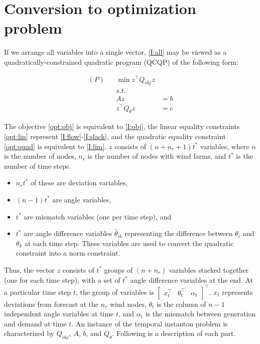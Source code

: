 \documentclass[conference]{IEEEtran}
\begin{document}
\section{Conversion to optimization problem}

If we arrange all variables into a single vector, \eqref{I:all} may be viewed as a quadratically-constrained quadratic program (QCQP) of the following form:

\begin{subequations}\label{opt}
\begin{align}
\label{opt:obj} (P)& & \min z^\top Q_{obj} z &\\
\nonumber && s.t.&\\
\label{opt:lin} && Az &= b \\
\label{opt:quad} && z^\top Q_{\theta}z &= c
\end{align}
\end{subequations}

The objective \eqref{opt:obj} is equivalent to \eqref{I:obj}, the linear equality constraints \eqref{opt:lin} represent \eqref{I:flow}-\eqref{I:slack}, and the quadratic equality constraint \eqref{opt:quad} is equivalent to \eqref{I:lim}. $z$ consists of $(n+n_r+1)t^*$ variables, where $n$ is the number of nodes, $n_r$ is the number of nodes with wind farms, and $t^*$ is the number of time steps.
\begin{itemize}
	\item $n_rt^*$ of these are deviation variables,
    \item $(n-1)t^*$ are angle variables,
    \item $t^*$ are mismatch variables (one per time step), and
    \item $t^*$ are angle difference variables $\hat{\theta}_{ik}$ representing the difference between $\theta_i$ and $\theta_k$ at each time step. These variables are used to convert the quadratic constraint into a norm constraint.
\end{itemize}

Thus, the vector $z$ consists of $t^*$ groups of $(n+n_r)$ variables stacked together (one for each time step), with a set of $t^*$ angle difference variables at the end. At a particular time step $t$, the group of variables is $\begin{bmatrix} x_t^\top & \theta_t^\top & \alpha_t \end{bmatrix}^\top$. $x_t$ represents deviations from forecast at the $n_r$ wind nodes, $\theta_t$ is the column of $n-1$ independent angle variables at time $t$, and $\alpha_t$ is the mismatch between generation and demand at time $t$. An instance of the temporal instanton problem is characterized by $Q_{obj}$, $A$, $b$, and $Q_{\theta}$. Following is a description of each part.
\end{document}
